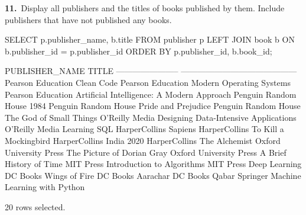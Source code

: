 \noindent\begin{minipage}{\linewidth}
\begingroup{}
{\fontsize{14}{17}\selectfont\textbf{11.}}\ Display all publishers and the titles of books published by them. Include publishers that have not published any books.\par
\endgroup\vspace{12pt}


\begin{sqlcode}
SELECT p.publisher_name, b.title
FROM publisher p
LEFT JOIN book b ON b.publisher_id = p.publisher_id
ORDER BY p.publisher_id, b.book_id;
\end{sqlcode}

\vspace{18pt}


\begin{sqlout}[fontsize=\small]
PUBLISHER_NAME           TITLE                                     
-----------------------  ------------------------------------------
Pearson Education        Clean Code
Pearson Education        Modern Operating Systems
Pearson Education        Artificial Intelligence: A Modern Approach
Penguin Random House     1984
Penguin Random House     Pride and Prejudice
Penguin Random House     The God of Small Things
O'Reilly Media           Designing Data-Intensive Applications
O'Reilly Media           Learning SQL
HarperCollins            Sapiens
HarperCollins            To Kill a Mockingbird
HarperCollins            India 2020
HarperCollins            The Alchemist
Oxford University Press  The Picture of Dorian Gray
Oxford University Press  A Brief History of Time
MIT Press                Introduction to Algorithms
MIT Press                Deep Learning
DC Books                 Wings of Fire
DC Books                 Aarachar
DC Books                 Qabar
Springer                 Machine Learning with Python

20 rows selected.
\end{sqlout}
\end{minipage}\par\vspace{24pt}

